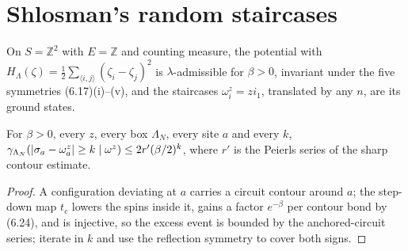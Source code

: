 \section{Shlosman's random staircases}

\begin{definition}
    \label{def:rs-6-16}
    \leanok

    On $S = \mathbb Z^2$ with $E = \mathbb Z$ and counting measure, the potential with
    $H_\Lambda(\zeta) = \tfrac12\sum_{\langle i,j\rangle}(\zeta_i - \zeta_j)^2$ is
    $\lambda$-admissible for $\beta > 0$, invariant under the five symmetries (6.17)(i)--(v), and
    the staircases $\omega^z_i = z i_1$, translated by any $n$, are its ground states.
\end{definition}

\begin{theorem}[Georgii (6.25)]
    \label{thm:rs-6-25}
    \leanok

    For $\beta > 0$, every $z$, every box $\Lambda_N$, every site $a$ and every $k$,
    $\gamma_{\Lambda_N}(\lvert \sigma_a - \omega^z_a\rvert \geq k \mid \omega^z) \leq 2 r'(\beta/2)^k$,
    where $r'$ is the Peierls series of the sharp contour estimate.
\end{theorem}
\begin{proof}
    \leanok
    A configuration deviating at $a$ carries a circuit contour around $a$; the step-down map
    $t_c$ lowers the spins inside it, gains a factor $e^{-\beta}$ per contour bond by (6.24), and
    is injective, so the excess event is bounded by the anchored-circuit series; iterate in $k$
    and use the reflection symmetry to cover both signs.
\end{proof}

